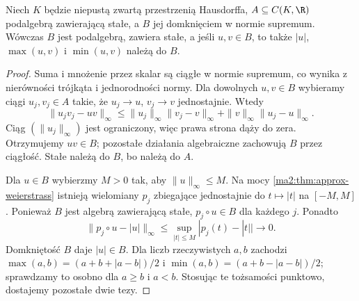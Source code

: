 \begin{lemat}
\label{ma2:lem:approx-lattice}
Niech $K$ będzie niepustą zwartą przestrzenią
Hausdorffa, $A\subseteq C(K,\R)$ podalgebrą
zawierającą stałe, a $B$ jej domknięciem
w normie supremum. Wówczas $B$ jest podalgebrą,
zawiera stałe, a jeśli $u,v\in B$, to także
$|u|$, $\max(u,v)$ i $\min(u,v)$ należą do $B$.
\end{lemat}
\begin{proof}
Suma i mnożenie przez skalar są ciągłe w normie
supremum, co wynika z nierówności trójkąta
i jednorodności normy. Dla dowolnych $u,v\in B$
wybieramy ciągi $u_j,v_j\in A$ takie, że
$u_j\to u$, $v_j\to v$ jednostajnie. Wtedy
\[
 \|u_jv_j-uv\|_\infty
 \le\|u_j\|_\infty\|v_j-v\|_\infty
    +\|v\|_\infty\|u_j-u\|_\infty.
\]
Ciąg $(\|u_j\|_\infty)$ jest ograniczony,
więc prawa strona dąży do zera.
Otrzymujemy $uv\in B$; pozostałe działania
algebraiczne zachowują $B$ przez ciągłość.
Stałe należą do $B$, bo należą do $A$.

Dla $u\in B$ wybierzmy $M>0$ tak, aby
$\|u\|_\infty\le M$. Na mocy
\ref{ma2:thm:approx-weierstrass} istnieją
wielomiany $p_j$ zbiegające jednostajnie do
$t\mapsto |t|$ na $[-M,M]$.
Ponieważ $B$ jest algebrą zawierającą stałe,
$p_j\circ u\in B$ dla każdego $j$.
Ponadto
\[
 \|p_j\circ u-|u|\|_\infty
 \le\sup_{|t|\le M}|p_j(t)-|t||\longrightarrow0.
\]
Domkniętość $B$ daje $|u|\in B$.
Dla liczb rzeczywistych $a,b$ zachodzi
$\max(a,b)=(a+b+|a-b|)/2$ i
$\min(a,b)=(a+b-|a-b|)/2$;
sprawdzamy to osobno dla $a\ge b$ i $a<b$.
Stosując te tożsamości punktowo, dostajemy
pozostałe dwie tezy.
\end{proof}

